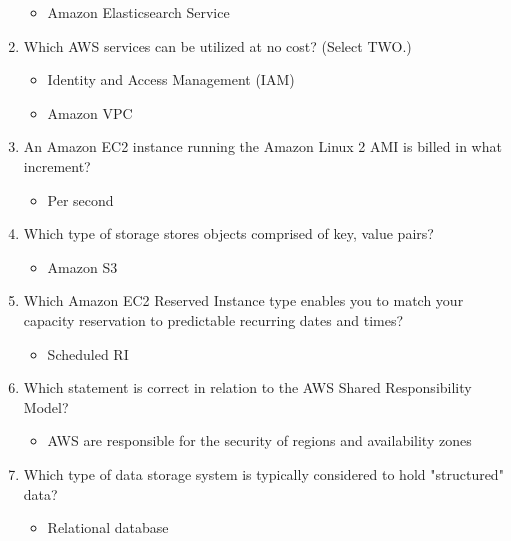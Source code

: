 \begin{enumerate}
	\begin{itemize}
	\item Amazon Elasticsearch Service
\end{itemize}

	\item Which AWS services can be utilized at no cost? (Select TWO.)

	\begin{itemize}
	\item Identity and Access Management (IAM)
	\item Amazon VPC
\end{itemize}

	\item An Amazon EC2 instance running the Amazon Linux 2 AMI is billed in what increment?

	\begin{itemize}
	\item Per second
\end{itemize}

	\item Which type of storage stores objects comprised of key, value pairs?

	\begin{itemize}
	\item Amazon S3
\end{itemize}

	\item Which Amazon EC2 Reserved Instance type enables you to match your capacity reservation to predictable recurring dates and times?

	\begin{itemize}
	\item Scheduled RI
\end{itemize}

	\item Which statement is correct in relation to the AWS Shared Responsibility Model?

	\begin{itemize}
	\item AWS are responsible for the security of regions and availability zones
\end{itemize}

	\item Which type of data storage system is typically considered to hold "structured" data?

	\begin{itemize}
	\item Relational database
\end{itemize}


\end{enumerate}
